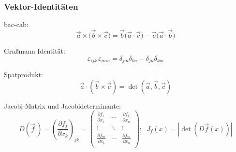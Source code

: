 \documentclass[11pt]{article}
\numberwithin{equation}{section}
\begin{document}
      \subsubsection{Vektor-Identitäten}
        bac-cab:
        \begin{equation}
          \vec{a}\times\big(\vec{b}\times\vec{c}\big) = \vec{b}\big(\vec{a}\cdot\vec{c}\big) - \vec{c}\big(\vec{a}\cdot\vec{b}\big)
        \end{equation}

        Graßmann Identität:
        \begin{equation}
          \varepsilon_{ijk}\,\varepsilon_{imn}=\delta_{jm}\delta_{kn}-\delta_{jn}\delta_{km}
        \end{equation}

        Spatprodukt:
        \begin{equation}
          \vec{a}\cdot\left(\vec{b}\times\vec{c}\right) = \det\left(\vec{a},\vec{b},\vec{c}\right)
        \end{equation}

    		Jacobi-Matrix und Jacobideterminante:
    		\begin{equation}
    			D\left(\vec{f}\,\right) = \left(\frac{\partial f_j}{\partial x_k}\right)_{jk}
    			= \left(\begin{matrix}
    			\frac{\partial f_1}{\partial x_1} & \dotsb & \frac{\partial f_1}{\partial x_n} \\
    			\vdots & \ddots & \vdots \\
    			\frac{\partial f_m}{\partial x_1} & \dotsb & \frac{\partial f_m}{\partial x_n} \\
    			\end{matrix}\right);\;\;J_f(x)=\left|\det\left(D\vec{f}(x)\right)\right|
    		\end{equation}
\end{document}
